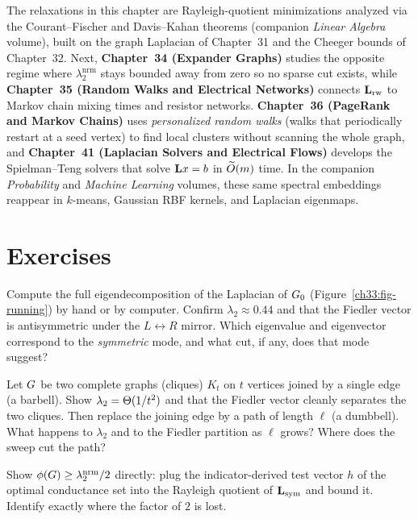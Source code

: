 \begin{connectionbox}
The relaxations in this chapter are Rayleigh-quotient minimizations analyzed via the Courant--Fischer and Davis--Kahan theorems (companion \emph{Linear Algebra} volume), built on the graph Laplacian of Chapter~31 and the Cheeger bounds of Chapter~32. Next, \textbf{Chapter~34 (Expander Graphs)} studies the opposite regime where $\lambda_2^{\mathrm{nrm}}$ stays bounded away from zero so no sparse cut exists, while \textbf{Chapter~35 (Random Walks and Electrical Networks)} connects $\mathbf{L}_{\mathrm{rw}}$ to Markov chain mixing times and resistor networks. \textbf{Chapter~36 (PageRank and Markov Chains)} uses \emph{personalized random walks} (walks that periodically restart at a seed vertex) to find local clusters without scanning the whole graph, and \textbf{Chapter~41 (Laplacian Solvers and Electrical Flows)} develops the Spielman--Teng solvers that solve $\mathbf{L} x = b$ in $\widetilde{O}(m)$ time. In the companion \emph{Probability} and \emph{Machine Learning} volumes, these same spectral embeddings reappear in $k$-means, Gaussian RBF kernels, and Laplacian eigenmaps.
\end{connectionbox}

\section{Exercises}
\label{ch33:exercises}

\begin{exercise}
Compute the full eigendecomposition of the Laplacian of $G_0$ (Figure~\ref{ch33:fig-running}) by hand or
by computer. Confirm $\lambda_2\approx0.44$ and that the Fiedler vector is antisymmetric under the
$L\leftrightarrow R$ mirror. Which eigenvalue and eigenvector correspond to the \emph{symmetric} mode, and
what cut, if any, does that mode suggest?
\end{exercise}

\begin{exercise}
Let $G$ be two complete graphs (cliques) $K_t$ on $t$ vertices joined by a single edge (a barbell). Show $\lambda_2 = \Theta(1/t^2)$ and that
the Fiedler vector cleanly separates the two cliques. Then replace the joining edge by a path of length
$\ell$ (a dumbbell). What happens to $\lambda_2$ and to the Fiedler partition as $\ell$ grows? Where does the
sweep cut the path?
\end{exercise}

\begin{exercise}
Show $\phi(G)\ge\lambda_2^{\mathrm{nrm}}/2$ directly: plug the indicator-derived test vector $h$ of the
optimal conductance set into the Rayleigh quotient of $\mathbf{L}_{\mathrm{sym}}$ and bound it. Identify exactly
where the factor of $2$ is lost.
\end{exercise}

